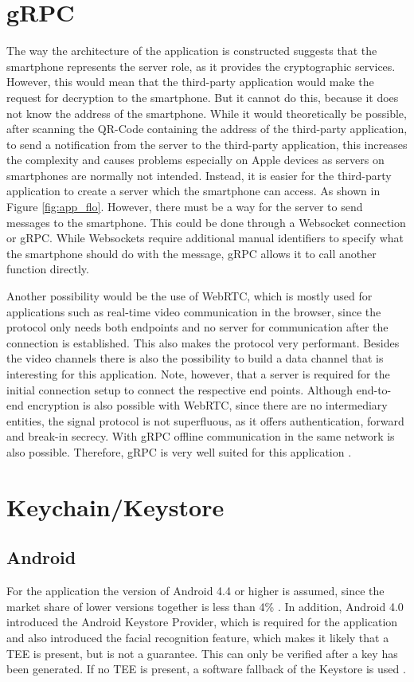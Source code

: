 \documentclass[12pt,oneside,a4paper,parskip]{scrbook}
\begin{document}
\section{gRPC}
The way the architecture of the application is constructed suggests that the smartphone represents the server role, as it provides the cryptographic services. However, this would mean that the third-party application would make the request for decryption to the smartphone. But it cannot do this, because it does not know the address of the smartphone. While it would theoretically be possible, after scanning the QR-Code containing the address of the third-party application, to send a notification from the server to the third-party application, this increases the complexity and causes problems especially on Apple devices as servers on smartphones are normally not intended. Instead, it is easier for the third-party application to create a server which the smartphone can access. As shown in Figure \ref{fig:app_flo}. However, there must be a way for the server to send messages to the smartphone. This could be done through a Websocket connection or gRPC. While Websockets require additional manual identifiers to specify what the smartphone should do with the message, gRPC allows it to call another function directly.

Another possibility would be the use of WebRTC, which is mostly used for applications such as real-time video communication in the browser, since the protocol only needs both endpoints and no server for communication after the connection is established. This also makes the protocol very performant. Besides the video channels there is also the possibility to build a data channel that is interesting for this application.  Note, however, that a server is required for the initial connection setup to connect the respective end points. Although end-to-end encryption is also possible with WebRTC, since there are no intermediary entities, the signal protocol is not superfluous, as it offers authentication, forward and break-in secrecy. With gRPC offline communication in the same network is also possible.  Therefore, gRPC is very well suited for this application \parencite{badach_webrtc_2013}.

\section{Keychain/Keystore}
\subsection{Android}
For the application the version of Android 4.4 or higher is assumed, since the market share of lower versions together is less than 4\% \parencite{google_distribution_2019}. \newline
In addition, Android 4.0 introduced the Android Keystore Provider, which is required for the application and also introduced the facial recognition feature, which makes it likely that a TEE is present, but is not a guarantee. This can only be verified after a key has been generated. If no TEE is present, a software fallback of the Keystore is used \parencite{cooijmans_analysis_2014}.
\end{document}
